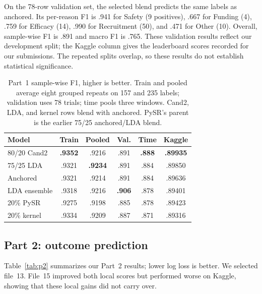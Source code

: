 \documentclass[10pt,twocolumn,letterpaper]{article}
\begin{document}
On the 78-row validation set, the selected blend predicts the same labels as
anchored. Its per-reason F1 is .941 for Safety (9 positives), .667 for Funding
(4), .759 for Efficacy (14), .990 for Recruitment (50), and .471 for Other (10).
Overall, sample-wise F1 is .891 and macro F1 is .765. These validation results
reflect our development split; the Kaggle column gives the leaderboard scores
recorded for our submissions. The repeated splits overlap, so these results
do not establish statistical significance.

\begin{table}[t]
\centering\small
\setlength{\tabcolsep}{2pt}
\begin{tabular*}{\columnwidth}{@{\extracolsep{\fill}}lccccc@{}}
\toprule
Model & Train & Pooled & Val. & Time & Kaggle \\
\midrule
80/20 Cand2 & \textbf{.9352} & .9216 & .891 & \textbf{.888} & \textbf{.89935} \\
75/25 LDA & .9321 & \textbf{.9234} & .891 & .884 & .89850 \\
Anchored & .9321 & .9214 & .891 & .884 & .89636 \\
LDA ensemble & .9318 & .9216 & \textbf{.906} & .878 & .89401 \\
20\% PySR & .9275 & .9198 & .885 & .878 & .89423 \\
20\% kernel & .9334 & .9209 & .887 & .871 & .89316 \\
\bottomrule
\end{tabular*}
\caption{Part~1 sample-wise F1, higher is better. Train and pooled average
eight grouped repeats on 157 and 235 labels; validation uses 78 trials; time
pools three windows. Cand2, LDA, and kernel rows blend with anchored. PySR's
parent is the earlier 75/25 anchored/LDA blend.}
\label{tab:p1}
\end{table}

\subsection{Part 2: outcome prediction}

Table~\ref{tab:p2} summarizes our Part~2 results; lower log loss is better.
We selected file~13. File~15 improved both local scores but performed worse
on Kaggle, showing that these local gains did not carry over.
\end{document}
